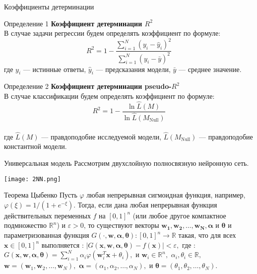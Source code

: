 \documentclass[10pt,pdf,hyperref={unicode}]{beamer}
\begin{document}
\begin{frame}{Коэффициенты детерминации}
	\justifying
	\small
\begin{block}{Определение 1}
	\textbf{Коэффициент детерминации $R^2$}\\
	В случае задачи регрессии будем определять коэффициент по формуле:
	$$R^{2}=1-\frac{\sum_{i=1}^{N}\left(y_{i}-\hat{y}_{i}\right)^{2}}{\sum_{i=1}^{N}\left(y_{i}-\bar{y}\right)^{2}}$$
	где $y_i$ --- истинные ответы, $\hat{y}_i$ --- предсказания модели, $\bar{y}$ --- среднее значение.
\end{block}





\begin{block}{Определение 2}
		\justifying
		\small
	\textbf{Коэффициент детерминации pseudo-$R^2$}\\
	В случае классификации будем определять коэффициент по формуле:
	$$R^{2}=1-\frac{\ln \hat{L}\left(M \right)}{\ln \hat{L}\left(M_{\text {Null}}\right)}$$\\
	где $\hat{L}\left(M \right)$ --- правдоподобие исследуемой модели, $\hat{L}\left(M_{\text {Null}}\right)$ --- правдоподобие константной модели.
\end{block}
\end{frame}
\begin{frame}{Универсальная модель}
\justifying
\small
Рассмотрим двухслойную полносвязную нейронную сеть.
\begin{center}
	\texttt{[image: 2NN.png]}
\end{center}
\begin{block}{Теорема Цыбенко}
	\justifying
	Пусть $\varphi$ любая непрерывная сигмоидная функция, например, $\varphi(\xi) = 1/(1 + e^{-\xi})$. Тогда, если дана любая непрерывная функция действительных переменных $f$ на $[0, 1]^n$ (или любое другое компактное подмножество $\mathbb{R}^n$) и $\varepsilon > 0$, то существуют векторы $\mathbf{w_1}, \mathbf{w_2}, \dots, \mathbf{w_N}, \mathbf{\alpha}$ и $\mathbf{\theta}$ и параметризованная функция $G(\mathbf{\cdot}, \mathbf{w}, \mathbf{\alpha}, \mathbf{\theta}): [0, 1]^n \to \mathbb{R}$ такая, что для всех $\mathbf{x} \in [0,1]^n$ выполняется
	: $\big|G(\mathbf{x}, \mathbf{w}, \mathbf{\alpha}, \mathbf{\theta}) - f(\mathbf{x})\big| < \varepsilon,$
	где
	: $G(\mathbf{x}, \mathbf{w}, \mathbf{\alpha}, \mathbf{\theta}) = \sum_{i=1}^N \alpha_i \varphi(\mathbf{w}_i^T \mathbf{x} + \theta_i),$
	и $\mathbf{w}_i \in \mathbb{R}^n,$ $\alpha_i, \theta_i \in \mathbb{R},$ $\mathbf{w} = (\mathbf{w}_1, \mathbf{w}_2, \dots, \mathbf{w}_N),$ $\mathbf{\alpha} = (\alpha_1, \alpha_2, \dots, \alpha_N),$ и $\mathbf{\theta} = (\theta_1, \theta_2, \dots, \theta_N).$
\end{block}

\end{frame}
\end{document}
